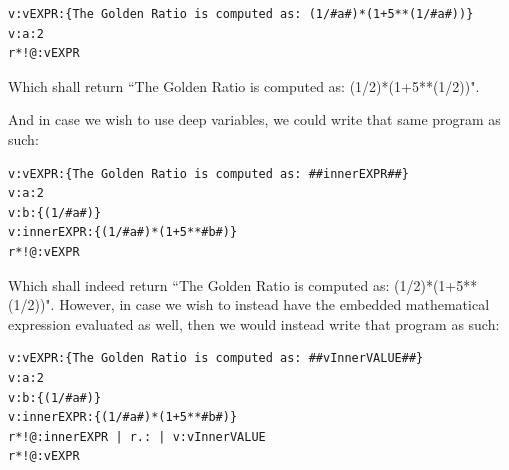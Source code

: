 \documentclass[a4paper, 18pt]{book} %
\begin{document}
{{{\vspace{2em}

  \begin{tcolorbox}[teaterminalstyle, title=R: EXAMPLE 9: Using R*!@:, breakable]
  \begin{lstlisting}[language=TEA,breaklines=true,]
v:vEXPR:{The Golden Ratio is computed as: (1/#a#)*(1+5**(1/#a#))}
v:a:2
r*!@:vEXPR
   \end{lstlisting}
  \end{tcolorbox}

\vspace{1em}

Which shall return ``The Golden Ratio is computed as: (1/2)*(1+5**(1/2))".

\vspace{2em}

And in case we wish to use deep variables, we could write that same program as such:


\vspace{2em}

  \begin{tcolorbox}[teaterminalstyle, title=R: EXAMPLE 10: Using R*!@:, breakable]
  \begin{lstlisting}[language=TEA,breaklines=true,]
v:vEXPR:{The Golden Ratio is computed as: ##innerEXPR##}
v:a:2
v:b:{(1/#a#)}
v:innerEXPR:{(1/#a#)*(1+5**#b#)}
r*!@:vEXPR
   \end{lstlisting}
  \end{tcolorbox}

\vspace{1em}

Which shall indeed return ``The Golden Ratio is computed as: (1/2)*(1+5**(1/2))". However, in case we wish to instead have the embedded mathematical expression evaluated as well, then we would instead write that program as such:


\vspace{2em}

  \begin{tcolorbox}[teaterminalstyle, title=R: EXAMPLE 11: Using R*!@:, breakable]
  \begin{lstlisting}[language=TEA,breaklines=true,]
v:vEXPR:{The Golden Ratio is computed as: ##vInnerVALUE##}
v:a:2
v:b:{(1/#a#)}
v:innerEXPR:{(1/#a#)*(1+5**#b#)}
r*!@:innerEXPR | r.: | v:vInnerVALUE
r*!@:vEXPR
   \end{lstlisting}
  \end{tcolorbox}

\vspace{1em}

}}}
\end{document}
